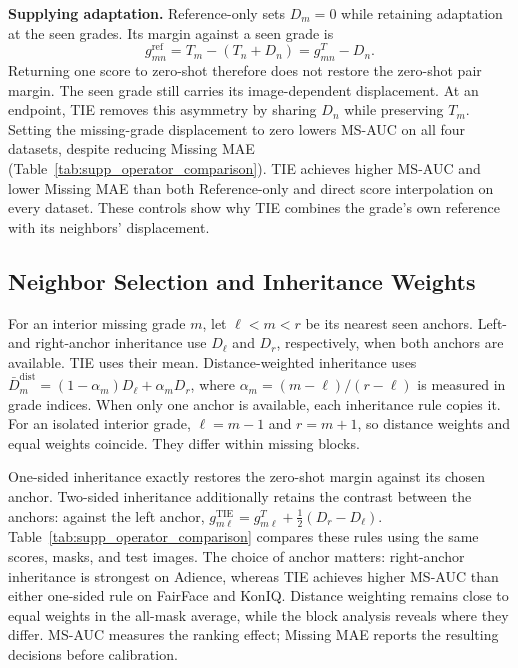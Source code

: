 \noindent\textbf{Supplying adaptation.}
Reference-only sets $D_m=0$ while retaining adaptation at the seen grades.
Its margin against a seen grade is
\begin{equation}
g^{\mathrm{ref}}_{mn}
=T_m-(T_n+D_n)
=g^T_{mn}-D_n.
\label{eq:supp_reference_only}
\end{equation}
Returning one score to zero-shot therefore does not restore the zero-shot pair margin.
The seen grade still carries its image-dependent displacement.
At an endpoint, TIE removes this asymmetry by sharing $D_n$ while preserving $T_m$.
Setting the missing-grade displacement to zero lowers MS-AUC on all four datasets, despite reducing Missing MAE (Table~\ref{tab:supp_operator_comparison}).
TIE achieves higher MS-AUC and lower Missing MAE than both Reference-only and direct score interpolation on every dataset.
These controls show why TIE combines the grade's own reference with its neighbors' displacement.

\subsection{Neighbor Selection and Inheritance Weights}
\label{sec:supp_inheritance_rules}

For an interior missing grade $m$, let $\ell<m<r$ be its nearest seen anchors.
Left- and right-anchor inheritance use $D_\ell$ and $D_r$, respectively, when both anchors are available.
TIE uses their mean.
Distance-weighted inheritance uses $\bar D_m^{\mathrm{dist}}=(1-\alpha_m)D_\ell+\alpha_mD_r$, where $\alpha_m=(m-\ell)/(r-\ell)$ is measured in grade indices.
When only one anchor is available, each inheritance rule copies it.
For an isolated interior grade, $\ell=m-1$ and $r=m+1$, so distance weights and equal weights coincide.
They differ within missing blocks.

One-sided inheritance exactly restores the zero-shot margin against its chosen anchor.
Two-sided inheritance additionally retains the contrast between the anchors: against the left anchor, $g^{\mathrm{TIE}}_{m\ell}=g^T_{m\ell}+\tfrac12(D_r-D_\ell)$.
Table~\ref{tab:supp_operator_comparison} compares these rules using the same scores, masks, and test images.
The choice of anchor matters: right-anchor inheritance is strongest on Adience, whereas TIE achieves higher MS-AUC than either one-sided rule on FairFace and KonIQ.
Distance weighting remains close to equal weights in the all-mask average, while the block analysis reveals where they differ.
MS-AUC measures the ranking effect; Missing MAE reports the resulting decisions before calibration.

